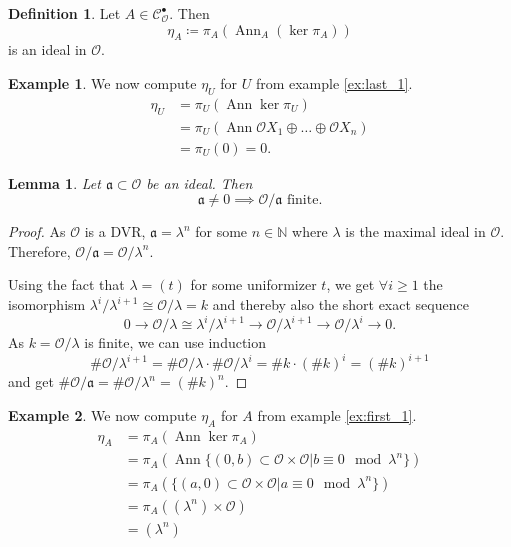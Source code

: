\documentclass{article}
\theoremstyle{plain}%
\newtheorem{lemma}{Lemma}[section]
\theoremstyle{definition}
\newtheorem{definition}{Definition}[section]
\newtheorem{example}{Example}[section]
\theoremstyle{remark}
\newcommand{\cob}{\mathcal{C}_\mathcal{O}^\bullet}
\newcommand{\ann}{\operatorname{Ann}}
\begin{document}
    \begin{definition}
        Let \(A \in \cob\). Then
        \[\eta_A \coloneqq \pi_A(\ann_A (\ker \pi_A))\] is an ideal in \(\mathcal{O}\).
    \end{definition}

    \begin{example}
        We now compute \(\eta_U\) for \(U\) from example \ref{ex:last_1}.
        \begin{align*}
            \eta_U &= \pi_U(\ann \ker \pi_U)\\
            &= \pi_U(\ann \mathcal{O}X_1 \oplus \dots \oplus \mathcal{O}X_n)\\
            &= \pi_U(0) = 0.
        \end{align*}
    \end{example}

    \begin{lemma}
        Let \(\mathfrak a \subset \mathcal{O}\) be an ideal. Then
        \[\mathfrak a \neq 0 \implies \mathcal{O}/\mathfrak a \text{ finite}.\]
    \end{lemma}
    \begin{proof}
        As \(\mathcal{O}\) is a DVR, \(\mathfrak a = \lambda^n\) for some \(n \in \mathbb N\) 
        where \(\lambda\) is the maximal ideal in \(\mathcal{O}\).
        Therefore, \(\mathcal{O}/\mathfrak{a} = \mathcal{O}/\lambda^n.\)

        Using the fact that \(\lambda = (t)\) for some uniformizer \(t\), we get \(\forall i \ge 1\) 
        the isomorphism \(\lambda^i/\lambda^{i+1} \cong \mathcal{O}/\lambda = k\) and thereby also the short exact sequence 
        \[0 \to \mathcal{O}/\lambda \cong \lambda^i/\lambda^{i+1} \to \mathcal{O}/\lambda^{i+1} \to \mathcal{O}/\lambda^{i} \to 0.\]
        As \(k = \mathcal{O}/\lambda\) is finite, we can use induction
        \[\# \mathcal{O}/\lambda^{i+1} = \# \mathcal{O}/\lambda \cdot \# \mathcal{O}/\lambda^i = \# k \cdot (\# k)^i = (\# k)^{i+1}\]
        and get \(\# \mathcal{O}/\mathfrak{a} = \# \mathcal{O}/\lambda^n = (\# k)^n\).
    \end{proof}

    \begin{example}\label{ex:first_eta}
        We now compute \(\eta_A\) for \(A\) from example \ref{ex:first_1}.
        \begin{align*}
            \eta_A &= \pi_A(\ann \ker \pi_A)\\
            &= \pi_A(\ann \{(0, b) \subset \mathcal{O}\times \mathcal{O} | b \equiv 0 \mod \lambda^n\})\\
            &= \pi_A(\{(a, 0) \subset \mathcal{O}\times \mathcal{O} | a \equiv 0 \mod \lambda^n\})\\
            &= \pi_A((\lambda^n) \times \mathcal{O})\\
            &= (\lambda^n)
        \end{align*}
    \end{example}
\end{document}
